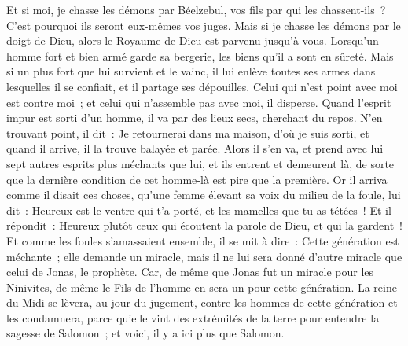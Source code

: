 \begin{multicols}{2}
Et si moi, je chasse les démons par Béelzebul, vos fils par qui les chassent-ils~? C'est pourquoi ils seront eux-mêmes vos juges.
Mais si je chasse les démons par le doigt de Dieu, alors le Royaume de Dieu est parvenu jusqu'à vous.
Lorsqu'un homme fort et bien armé garde sa bergerie, les biens qu'il a sont en sûreté.
Mais si un plus fort que lui survient et le vainc, il lui enlève toutes ses armes dans lesquelles il se confiait, et il partage ses dépouilles.
Celui qui n'est point avec moi est contre moi~; et celui qui n'assemble pas avec moi, il disperse.
Quand l'esprit impur est sorti d'un homme, il va par des lieux secs, cherchant du repos. N'en trouvant point, il dit~: Je retournerai dans ma maison, d'où je suis sorti,
et quand il arrive, il la trouve balayée et parée.
Alors il s'en va, et prend avec lui sept autres esprits plus méchants que lui, et ils entrent et demeurent là, de sorte que la dernière condition de cet homme-là est pire que la première.
Or il arriva comme il disait ces choses, qu'une femme élevant sa voix du milieu de la foule, lui dit~: Heureux est le ventre qui t'a porté, et les mamelles que tu as tétées~!
Et il répondit~: Heureux plutôt ceux qui écoutent la parole de Dieu, et qui la gardent~!
Et comme les foules s'amassaient ensemble, il se mit à dire~: Cette génération est méchante~; elle demande un miracle, mais il ne lui sera donné d'autre miracle que celui de Jonas, le prophète.
Car, de même que Jonas fut un miracle pour les Ninivites, de même le Fils de l'homme en sera un pour cette génération.
La reine du Midi se lèvera, au jour du jugement, contre les hommes de cette génération et les condamnera, parce qu'elle vint des extrémités de la terre pour entendre la sagesse de Salomon~; et voici, il y a ici plus que Salomon.

\end{multicols}
